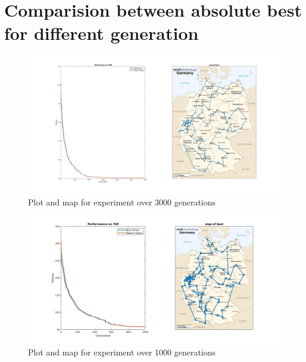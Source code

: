 \documentclass[a4paper, 12pt]{article}
\begin{document}
\section{Comparision between absolute best for different generation}
\begin{figure}[ht!]
    \centering
    \includegraphics[width=1.0\linewidth]{images/BestPath_with_fitness.jpg}
    \caption{Plot and map for experiment over 3000 generations}
    \label{fig:plotAndMap3000}
\end{figure}

\begin{figure}[ht!]
    \centering
    \includegraphics[width=1.0\linewidth]{images/BestPath_with_fitness_1000.jpg}
    \caption{Plot and map for experiment over 1000 generations}
    \label{fig:plotAndMap1000}
\end{figure}
\end{document}
